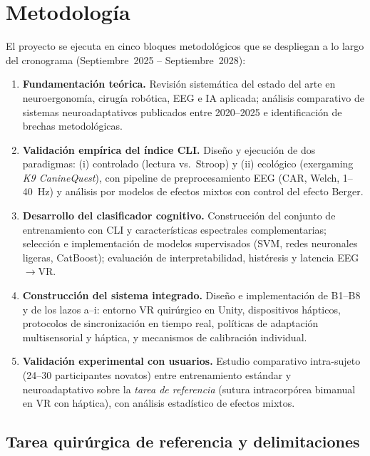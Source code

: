 \documentclass[12pt]{article}
\begin{document}

\section{Metodología}

El proyecto se ejecuta en cinco bloques metodológicos que se
despliegan a lo largo del cronograma (Septiembre~2025 --
Septiembre~2028):

\begin{enumerate}
    \item \textbf{Fundamentación teórica.} Revisión sistemática
    del estado del arte en neuroergonomía, cirugía robótica, EEG
    e IA aplicada; análisis comparativo de sistemas
    neuroadaptativos publicados entre 2020--2025 e identificación
    de brechas metodológicas.
    \item \textbf{Validación empírica del índice CLI.} Diseño y
    ejecución de dos paradigmas: (i) controlado
    (lectura vs.\ Stroop) y (ii) ecológico (exergaming
    \textit{K9 CanineQuest}), con pipeline de preprocesamiento
    EEG (CAR, Welch, 1--40~Hz) y análisis por modelos de efectos
    mixtos con control del efecto Berger.
    \item \textbf{Desarrollo del clasificador cognitivo.}
    Construcción del conjunto de entrenamiento con CLI y
    características espectrales complementarias; selección e
    implementación de modelos supervisados (SVM, redes neuronales
    ligeras, CatBoost); evaluación de interpretabilidad,
    histéresis y latencia EEG$\to$VR.
    \item \textbf{Construcción del sistema integrado.} Diseño e
    implementación de B1--B8 y de los lazos a--i: entorno VR
    quirúrgico en Unity, dispositivos hápticos, protocolos de
    sincronización en tiempo real, políticas de adaptación
    multisensorial y háptica, y mecanismos de calibración
    individual.
    \item \textbf{Validación experimental con usuarios.} Estudio
    comparativo intra-sujeto (24--30 participantes novatos)
    entre entrenamiento estándar y neuroadaptativo sobre la
    \emph{tarea de referencia} (sutura intracorpórea bimanual en
    VR con háptica), con análisis estadístico de efectos mixtos.
\end{enumerate}

\subsection{Tarea quirúrgica de referencia y delimitaciones}
\end{document}
